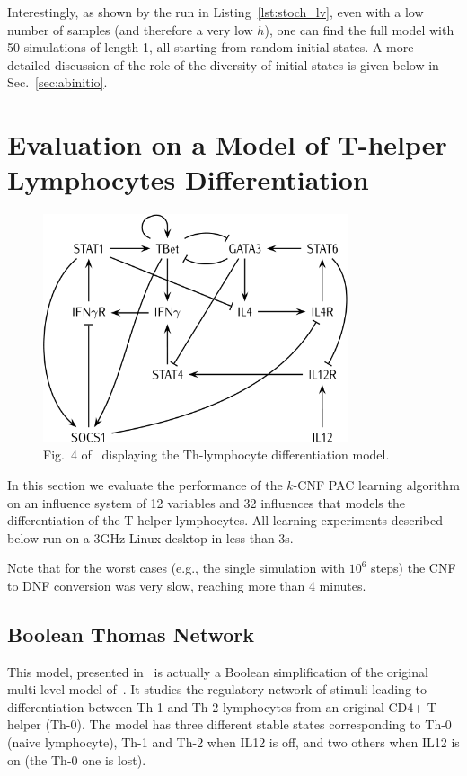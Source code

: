 \documentclass{llncs}
\begin{document}
Interestingly, as shown by the run in Listing~\ref{lst:stoch_lv}, even with a low number of
samples (and therefore a very low $h$), one can find the full model with 50
simulations of length 1, all starting from random initial states.
A more detailed discussion of the role of the diversity of initial states is
given below in Sec.~\ref{sec:abinitio}.



\section{Evaluation on a Model of T-helper Lymphocytes Differentiation}\label{ex:lympho}


\begin{figure}[htbp]
   \centering
   \includegraphics[width=0.8\textwidth]{th_net_clean.png}
   \caption{Fig.~4 of~\cite{RRMTC06tcsb} displaying the Th-lymphocyte
   differentiation model.\label{fig:lympho}}
\end{figure}

In this section we evaluate the performance of the $k$-CNF PAC learning
algorithm on an influence system of 12 variables and 32 influences that models
the differentiation of the T-helper lymphocytes.
All learning experiments described below run on a
3GHz Linux desktop in less than 3s.

Note that for the worst cases (e.g., the single simulation with $10^6$ steps)
the CNF to DNF conversion was very slow, reaching more than 4 minutes.

\subsection{Boolean Thomas Network}

This model, presented in~\cite{RRMTC06tcsb} is actually a Boolean
simplification of the original multi-level model
of~\cite{Mendoza06biosystems}. It studies the regulatory network of stimuli
leading to differentiation between Th-1 and Th-2 lymphocytes from an original
CD4+ T helper (Th-0).
The model has three different stable states corresponding to Th-0 (naive
lymphocyte), Th-1 and Th-2 when IL12 is off, and two others when IL12 is on
(the Th-0 one is lost).
\end{document}
